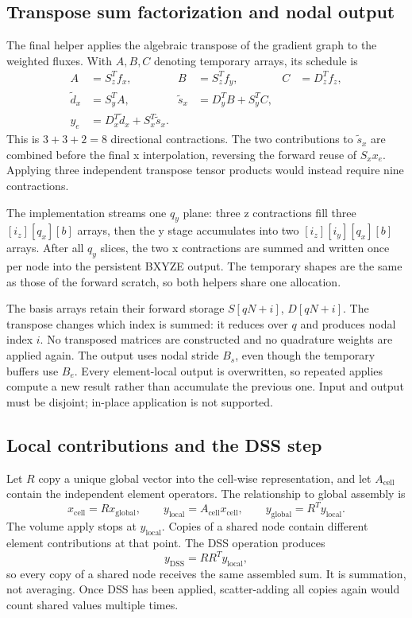 \documentclass[11pt]{article}
\begin{document}
\subsection{Transpose sum factorization and nodal output}

The final helper applies the algebraic transpose of the gradient graph to
the weighted fluxes. With \(A,B,C\) denoting temporary arrays, its schedule is
\[
\begin{aligned}
 A&=S_z^Tf_x,&B&=S_z^Tf_y,&C&=D_z^Tf_z,\\
 \widetilde d_x&=S_y^TA,&
 \widetilde s_x&=D_y^TB+S_y^TC,\\
 y_e&=D_x^T\widetilde d_x+S_x^T\widetilde s_x.
\end{aligned}
\]
This is \(3+3+2=8\) directional contractions. The two contributions to
\(\widetilde s_x\) are combined before the final x interpolation, reversing
the forward reuse of \(S_xx_e\). Applying three independent transpose tensor
products would instead require nine contractions.

The implementation streams one \(q_y\) plane: three z contractions fill
three \([i_z][q_x][b]\) arrays, then the y stage accumulates into two
\([i_z][i_y][q_x][b]\) arrays. After all \(q_y\) slices, the two x contractions
are summed and written once per node into the persistent BXYZE output.
The temporary shapes are the same as those of the forward scratch, so both
helpers share one allocation.

The basis arrays retain their forward storage \(S[qN+i]\), \(D[qN+i]\).
The transpose changes which index is summed: it reduces over \(q\) and
produces nodal index \(i\). No transposed matrices are constructed and no
quadrature weights are applied again.
The output uses nodal stride \(B_s\), even though the temporary buffers use
\(B_e\). Every element-local output is overwritten, so repeated applies compute
a new result rather than accumulate the previous one. Input and output must
be disjoint; in-place application is not supported.

\subsection{Local contributions and the DSS step}

Let \(R\) copy a unique global vector into the cell-wise representation, and
let \(A_{\mathrm{cell}}\) contain the independent element operators. The
relationship to global assembly is
\[
 x_{\mathrm{cell}}=Rx_{\mathrm{global}},\qquad
 y_{\mathrm{local}}=A_{\mathrm{cell}}x_{\mathrm{cell}},\qquad
 y_{\mathrm{global}}=R^Ty_{\mathrm{local}}.
\]
The volume apply stops at \(y_{\mathrm{local}}\). Copies of a shared node
contain different element contributions at that point.
The DSS operation produces
\[
 y_{\mathrm{DSS}}=RR^Ty_{\mathrm{local}},
\]
so every copy of a shared node receives the same assembled sum.
It is summation, not averaging. Once DSS has been applied, scatter-adding
all copies again would count shared values multiple times.
\end{document}

